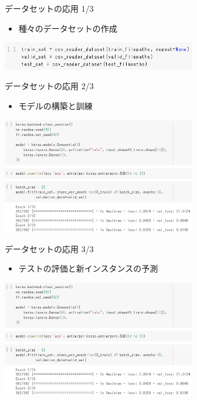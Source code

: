 \documentclass[aspectratio=169, dvipdfmx, 14pt, xcolor={svgnames,dvipsnames}, t]{beamer}
\begin{document}

\begin{frame}{データセットの応用 1/3}

  \begin{itemize}
    \tightlist
    \item
          種々のデータセットの作成
  \end{itemize}

  \centering
  \includegraphics[width=240pt]{img/hands-on-ml_13-1-6_1.png}

\end{frame}


\begin{frame}{データセットの応用 2/3}

  \begin{itemize}
    \tightlist
    \item
          モデルの構築と訓練
  \end{itemize}

  \centering
  \includegraphics[width=240pt]{img/hands-on-ml_13-1-6_2.png}

\end{frame}


\begin{frame}{データセットの応用 3/3}

  \begin{itemize}
    \tightlist
    \item
          テストの評価と新インスタンスの予測
  \end{itemize}

  \centering
  \includegraphics[width=240pt]{img/hands-on-ml_13-1-6_2.png}

\end{frame}
\end{document}
